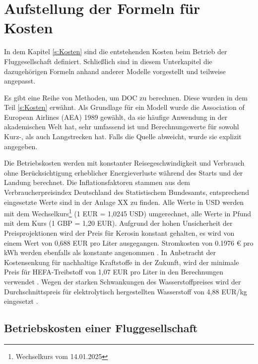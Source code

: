 \section{Aufstellung der Formeln für Kosten}
\label{s:Aufstellung der Formeln für Kosten}

In dem Kapitel \ref{s:Kosten} sind die entstehenden Kosten beim Betrieb der Fluggesellschaft definiert.
Schließlich sind in diesem Unterkapitel die dazugehörigen Formeln anhand anderer Modelle vorgestellt und teilweise angepasst. 

Es gibt eine Reihe von Methoden, um DOC zu berechnen. 
Diese wurden in dem Teil \ref{s:Kosten} erwähnt.
Als Grundlage für ein Modell wurde die Association of European Airlines (AEA) 1989 gewählt, 
da sie häufige Anwendung in der akademischen Welt hat, 
sehr umfassend ist und Berechnungswerte für sowohl Kurz-, als auch Langstrecken hat. 
Falls die Quelle abweicht, wurde sie explizit angegeben. %

Die Betriebskosten werden mit konstanter Reisegeschwindigkeit und Verbrauch ohne 
Berücksichtigung erheblicher Energieverluste während des Starts und der Landung berechnet. 
Die Inflationsfaktoren stammen aus dem Verbraucherpreisindex Deutschland des Statistischem Bundesamts, 
entsprechend eingesetzte Werte sind in der Anlage XX zu finden. %
Alle Werte in USD werden mit dem Wechselkurs\footnote{Wechselkurs vom 14.01.2025} (1 EUR = 1,0245 USD)
umgerechnet, alle Werte in Pfund mit dem Kurs (1 GBP = 1,20 EUR).
Aufgrund der hohen Unsicherheit der Preisprojektionen wird der Preis für Kerosin 
konstant gehalten, es wird von einem Wert von 0,688 EUR pro Liter \cite{iata_industry_statistics_2024} ausgegangen. 
Stromkosten von 0.1976 € pro kWh werden ebenfalls als konstante angenommen \cite{eurostat_nrg_pc_205}.
In Anbetracht der Kostensenkung für nachhaltige Kraftstoffe in der Zukunft, 
wird der minimale Preis für HEFA-Treibstoff von 1,07 EUR pro Liter in den Berechnungen verwendet \cite{watson2024sustainable}.
Wegen der starken Schwankungen des Wasserstoffpreises wird der Durchschnittspreis für 
elektrolytisch hergestellten Wasserstoff von 4,88 EUR/kg eingesetzt \cite{hoelzen2022hydrogen}.
%
%
\subsection{Betriebskosten einer Fluggesellschaft}

